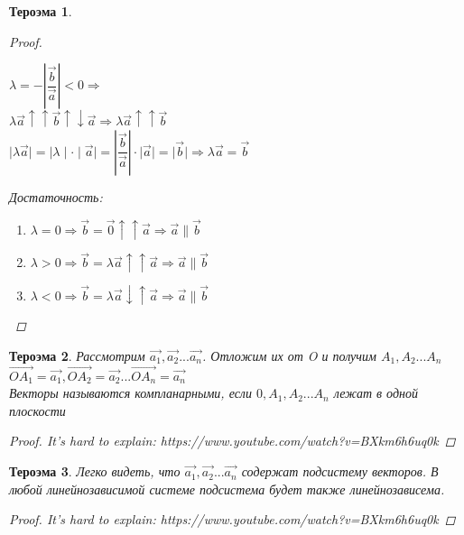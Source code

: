 \documentclass[oneside]{book}
\newtheorem{thm}{Тероэма}[chapter] %
\begin{document}
\begin{enumerate}
\begin{itemize}
\begin{enumerate}
\begin{thm}
\begin{proof}
\begin{enumerate}
        $\lambda = - \left| \dfrac{\vec{b}}{\vec{a}}\right|<0 \Longrightarrow$\\
        $\lambda\vec{a} \uparrow \uparrow  \vec{b} \uparrow \downarrow\vec{a} \Longrightarrow \lambda\vec{a} \uparrow \uparrow \vec{b} $\\
        $\mid \lambda\vec{a} \mid = \mid \lambda \mid \cdot \mid \vec{a} \mid = 
        \left| \dfrac{\vec{b}}{\vec{a}}\right| \cdot \mid \vec{a} \mid = \mid \vec{b} \mid\Rightarrow \lambda\vec{a}= \vec{b}$\\
        \end{enumerate}
    \par Достаточность: \\
    \begin{enumerate}
      \item $\lambda=0\Rightarrow \vec{b}=\vec{0}\uparrow \uparrow \vec{a}\Rightarrow \vec{a}\parallel \vec{b}$
      \item $\lambda>0\Rightarrow \vec{b}=\lambda\vec{a}\uparrow \uparrow \vec{a}\Rightarrow \vec{a}\parallel \vec{b}$
      \item  $\lambda<0\Rightarrow \vec{b}=\lambda\vec{a}\downarrow \uparrow \vec{a}\Rightarrow \vec{a}\parallel \vec{b}$
    \end{enumerate}
    \end{proof}
\end{thm}

\begin{thm}
  Рассмотрим $\vec{a_{1}},\vec{a_{2}}...\vec{a_{n}}$. Отложим их от O и получим $A_{1},A_{2}...A_{n}$\\
  $\vec{OA_{1}}=\vec{a_{1}},\vec{OA_{2}}=\vec{a_{2}}...\vec{OA_{n}}=\vec{a_{n}}$\\
  Векторы называются компланарными, если $0,A_{1},A_{2}...A_{n}$ лежат в одной плоскости
\begin{proof}
It's hard to explain: https://www.youtube.com/watch?v=BXkm6h6uq0k
\end{proof}
\end{thm}

\begin{thm}
  Легко видеть, что $\vec{a_{1}},\vec{a_{2}}...\vec{a_{n}}$ содержат подсистему  векторов. В любой линейнозависимой системе подсистема будет также линейнозависема.
\begin{proof}
  It's hard to explain: https://www.youtube.com/watch?v=BXkm6h6uq0k
\end{proof}
\end{thm}


\end{enumerate}
\end{itemize}
\end{enumerate}
\end{document}
